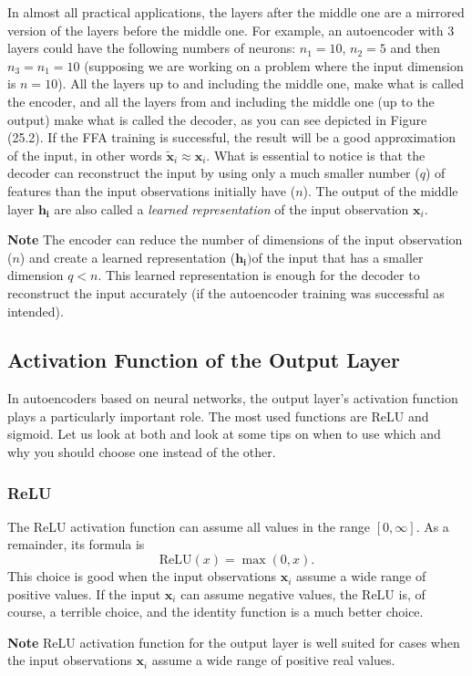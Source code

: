 \documentclass[12pt,a4]{article}
\newenvironment{note}
{\begin{mdframed}[backgroundcolor=light-gray, roundcorner=10pt,leftmargin=1, rightmargin=1, innerleftmargin=15, innertopmargin=15,innerbottommargin=15, outerlinewidth=1, linecolor=light-gray]}
{\end{mdframed}}
\begin{document}
In almost all practical applications, the layers after the middle one are a mirrored version of the layers before the middle one. For example, an autoencoder with 3 layers could have the following numbers of neurons: \( n_{1} = 10\), \( n_{2} = 5\) and then \( n_{3} = n_{1} = 10\) (supposing we are working on a problem where the input dimension is \( n = 10\)). All the layers up to and including the middle one, make what is called the encoder, and all the layers from and including the middle one (up to the output) make what is called the decoder, as you can see depicted in Figure (25.2). If the FFA training is successful, the result will be a good approximation of the input, in other words \(\tilde{\mathbf{x}}_{i}\approx\mathbf{x}_{i}\). What is essential to notice is that the decoder can reconstruct the input by using only a much smaller number (\( q\)) of features than the input observations initially have (\( n\)). The output of the middle layer \(\mathbf{h}_{\mathbf{i}}\)\textbf{ }are also called a \textit{learned representation} of the input observation \(\mathbf{x}_{i}\). 

\begin{note}
{\bf Note} The encoder can reduce the number of dimensions of the input observation (\( n\)) and create a learned representation (\(\mathbf{h}_{\mathbf{i}}\mathbf{) }\)of the input that has a smaller dimension \( q<n\). This learned representation is enough for the decoder to reconstruct the input accurately (if the autoencoder training was successful as intended). 
\end{note}

\subsection{Activation Function of the Output Layer}

In autoencoders based on neural networks, the output layer's activation function plays a particularly important role.  The most used functions are ReLU and sigmoid. Let us look at both and look at some tips on when to use which and why you should choose one instead of the other.


\subsubsection{ReLU}

The  ReLU activation function can assume all values in the range \(\left[0,\infty\right]\). As a remainder, its formula is
\begin{equation}
\textrm{ReLU}\left(x\right) = \max\left(0,x\right).
\end{equation}
This choice is good when the input observations \(\mathbf{x}_{i}\) assume a wide range of positive values.
If the input \(\mathbf{x}_{i}\) can assume negative values, the ReLU is, of course, a terrible choice, and the identity function is a much better choice.
\begin{note}
\textbf{Note }ReLU activation function for the output layer is well suited for cases when the input observations \(\mathbf{x}_{i}\) assume a wide range of positive real values.
\end{note}
\end{document}
